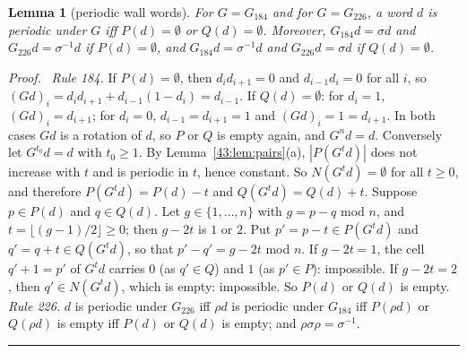 \documentclass[10pt,a4paper]{article}
\newtheorem{lemma}[theorem]{Lemma}
\newcommand{\qedmark}{\rule{1.1ex}{1.1ex}}
\newenvironment{proof}[1][Proof]{\par\smallskip\noindent\textit{#1.}\ }{\hfill\qedmark\par\smallskip}
\begin{document}
\begin{lemma}[periodic wall words]\label{43:lem:pww}
For $G=G_{184}$ and for $G=G_{226}$, a word $d$ is periodic under $G$ iff $P(d)=\emptyset$ or $Q(d)=\emptyset$.
Moreover, $G_{184}d=\sigma d$ and $G_{226}d=\sigma^{-1}d$ if $P(d)=\emptyset$, and $G_{184}d=\sigma^{-1}d$ and
$G_{226}d=\sigma d$ if $Q(d)=\emptyset$.
\end{lemma}
\begin{proof}
\emph{Rule 184.} If $P(d)=\emptyset$, then $d_id_{i+1}=0$ and $d_{i-1}d_i=0$ for all $i$, so
$(Gd)_i=d_id_{i+1}+d_{i-1}(1-d_i)=d_{i-1}$. If $Q(d)=\emptyset$: for $d_i=1$, $(Gd)_i=d_{i+1}$; for $d_i=0$,
$d_{i-1}=d_{i+1}=1$ and $(Gd)_i=1=d_{i+1}$. In both cases $Gd$ is a rotation of $d$, so $P$ or $Q$ is empty
again, and $G^nd=d$.
Conversely let $G^{t_0}d=d$ with $t_0\ge 1$. By Lemma~\ref{43:lem:pairs}(a), $|P(G^td)|$ does not increase with
$t$ and is periodic in $t$, hence constant. So $N(G^td)=\emptyset$ for all $t\ge 0$, and therefore
$P(G^td)=P(d)-t$ and $Q(G^td)=Q(d)+t$. Suppose $p\in P(d)$ and $q\in Q(d)$. Let $g\in\{1,\dots,n\}$ with
$g=p-q$ mod $n$, and $t=\lfloor (g-1)/2\rfloor\ge 0$; then $g-2t$ is $1$ or $2$. Put
$p'=p-t\in P(G^td)$ and $q'=q+t\in Q(G^td)$, so that $p'-q'=g-2t$ mod $n$. If $g-2t=1$, the cell $q'+1=p'$ of
$G^td$ carries $0$ (as $q'\in Q$) and $1$ (as $p'\in P$): impossible. If $g-2t=2$, then $q'\in N(G^td)$, which is
empty: impossible. So $P(d)$ or $Q(d)$ is empty.
\emph{Rule 226.} $d$ is periodic under $G_{226}$ iff $\rho d$ is periodic under $G_{184}$ iff $P(\rho d)$ or
$Q(\rho d)$ is empty iff $P(d)$ or $Q(d)$ is empty; and $\rho\sigma\rho=\sigma^{-1}$.
\end{proof}
\end{document}

